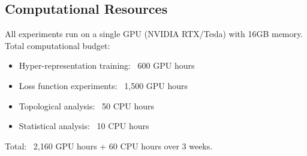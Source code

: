 \subsection{Computational Resources}

All experiments run on a single GPU (NVIDIA RTX/Tesla) with 16GB memory. Total computational budget:
\begin{itemize}
    \item Hyper-representation training: ~600 GPU hours
    \item Loss function experiments: ~1,500 GPU hours
    \item Topological analysis: ~50 CPU hours
    \item Statistical analysis: ~10 CPU hours
\end{itemize}

Total: ~2,160 GPU hours + 60 CPU hours over 3 weeks.
